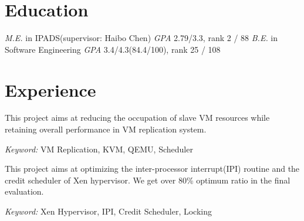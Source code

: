 \documentclass{resume}
\begin{document}


 
\section{Education}
\textit{M.E.} in IPADS(supervisor: Haibo Chen)
\textit{GPA} 2.79/3.3, rank 2 / 88
\textit{B.E.} in Software Engineering
\textit{GPA} 3.4/4.3(84.4/100), rank 25 / 108



\section{Experience}


This project aims at reducing the occupation of slave VM resources while retaining overall performance in VM replication system.

\textit{Keyword: } VM Replication, KVM,  QEMU, Scheduler



This project aims at optimizing the inter-processor interrupt(IPI) routine and the credit scheduler of Xen hypervisor. We get over 80\% optimum ratio in the final evaluation.

\textit{Keyword: } Xen Hypervisor, IPI, Credit Scheduler, Locking

\end{document}
